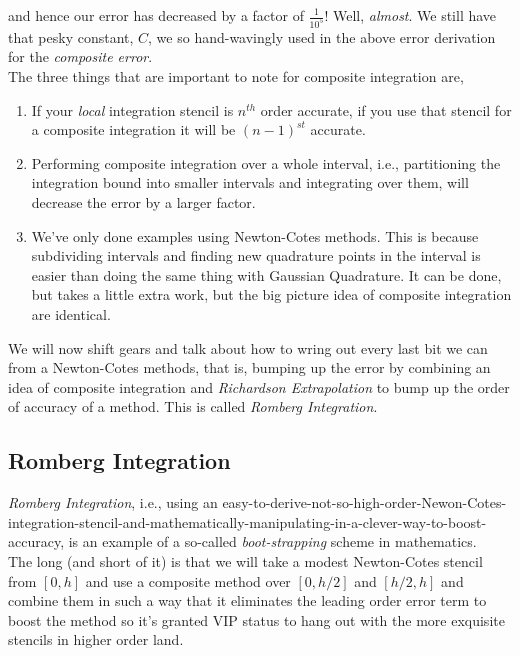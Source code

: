 \documentclass[paper=a4, fontsize=11pt]{scrartcl} %
\numberwithin{equation}{section} %
\numberwithin{figure}{section} %
\numberwithin{table}{section} %
\begin{document}
 and hence our error has decreased by a factor of $\frac{1}{10^5}$! Well, \emph{almost}. We still have that pesky constant, $C$, we so hand-wavingly used in the above error derivation for the \emph{composite error}. \\
 
The three things that are important to note for composite integration are,
 
 \begin{enumerate}
 \item If your \emph{local} integration stencil is $n^{th}$ order accurate, if you use that stencil for a composite integration it will be $(n-1)^{st}$ accurate.
 \item Performing composite integration over a whole interval, i.e., partitioning the integration bound into smaller intervals and integrating over them, will decrease the error by a larger factor.
 \item We've only done examples using Newton-Cotes methods. This is because subdividing intervals and finding new quadrature points in the interval is easier than doing the same thing with Gaussian Quadrature. It can be done, but takes a little extra work, but the big picture idea of composite integration are identical. 
 \end{enumerate}
 
 We will now shift gears and talk about how to wring out every last bit we can from a Newton-Cotes methods, that is, bumping up the error by combining an idea of composite integration and \emph{Richardson Extrapolation} to bump up the order of accuracy of a method. This is called \emph{Romberg Integration}. \\
 
 
 \subsection{Romberg Integration}
 
 $ $\\
 
 \emph{Romberg Integration}, i.e., using an easy-to-derive-not-so-high-order-Newon-Cotes-integration-stencil-and-mathematically-manipulating-in-a-clever-way-to-boost-accuracy, is an example of a so-called \emph{boot-strapping} scheme in mathematics.\\ 
 
The long (and short of it) is that we will take a modest Newton-Cotes stencil from $[0,h]$ and use a composite method over $[0,h/2]$ and $[h/2,h]$ and combine them in such a way that it eliminates the leading order error term to boost the method so it's granted VIP status to hang out with the more exquisite stencils in higher order land. \\
\end{document}
